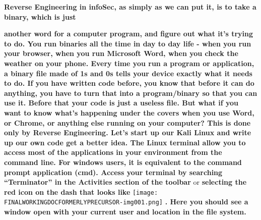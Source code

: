 \textbf{Reverse Engineering in infoSec, as simply as we can put it, is to take a
}\textbf{\textcolor[rgb]{0.21960784,0.4627451,0.11372549}{binary, }}\textbf{which is just }

\textbf{another word for a computer program, and figure out what it's trying to do. You run binaries all the time in day
to day life - when you run your browser, when you run Microsoft Word, when you check the weather on your phone. Every
time you run a program or application, a binary file made of 1s and 0s tells your device exactly what it needs to do.
\newline
\newline
If you have written code before, you know that before it can do anything, you have to turn that into a program/binary so
that you can use it. Before that your code is just a useless file. But what if you want to know what's happening under
the covers when you use Word, or Chrome, or anything else running on your computer? This is done only by Reverse
Engineering.  \newline
\newline
Let's start up our Kali Linux and write up our own code get a better idea. The Linux terminal allow you to access most
of the applications in your environment from the command line. For windows users, it is equivalent to the command
prompt application (cmd). Access your terminal by searching ``Terminator'' in the Activities section of the toolbar
}or\textbf{ selecting the red icon on the dash that looks like }
\texttt{[image: FINALWORKINGDOCFORMERLYPRECURSOR-img001.png]}
 \textbf{. Here you should see a window open with your current user and location in the file system.\newline
}
